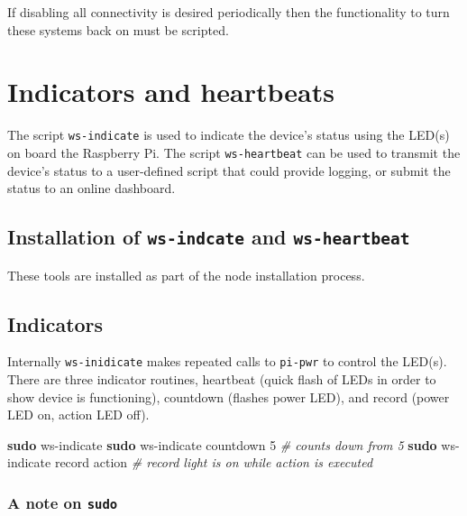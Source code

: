 \documentclass[
]{book}
\newenvironment{Shaded}{\begin{snugshade}}{\end{snugshade}}
\newcommand{\CommentTok}[1]{\textcolor[rgb]{0.56,0.35,0.01}{\textit{#1}}}
\newcommand{\FunctionTok}[1]{\textcolor[rgb]{0.13,0.29,0.53}{\textbf{#1}}}
\newcommand{\NormalTok}[1]{#1}
\begin{document}
If disabling all connectivity is desired periodically then the functionality to turn these systems back on must be scripted.

\hypertarget{indicators-and-heartbeats}{%
\chapter{Indicators and heartbeats}\label{indicators-and-heartbeats}}

The script \texttt{ws-indicate} is used to indicate the device's status using the LED(s) on board the Raspberry Pi. The script \texttt{ws-heartbeat} can be used to transmit the device's status to a user-defined script that could provide logging, or submit the status to an online dashboard.

\hypertarget{installation-of-ws-indcate-and-ws-heartbeat}{%
\section{\texorpdfstring{Installation of \texttt{ws-indcate} and \texttt{ws-heartbeat}}{Installation of ws-indcate and ws-heartbeat}}\label{installation-of-ws-indcate-and-ws-heartbeat}}

These tools are installed as part of the node installation process.

\hypertarget{indicators}{%
\section{Indicators}\label{indicators}}

Internally \texttt{ws-inidicate} makes repeated calls to \texttt{pi-pwr} to control the LED(s). There are three indicator routines, heartbeat (quick flash of LEDs in order to show device is functioning), countdown (flashes power LED), and record (power LED on, action LED off).

\begin{Shaded}
\begin{Highlighting}[]
\FunctionTok{sudo}\NormalTok{ ws{-}indicate}
\FunctionTok{sudo}\NormalTok{ ws{-}indicate countdown 5   }\CommentTok{\# counts down from 5}
\FunctionTok{sudo}\NormalTok{ ws{-}indicate record action }\CommentTok{\# record light is on while action is executed}
\end{Highlighting}
\end{Shaded}

\hypertarget{a-note-on-sudo}{%
\subsection{\texorpdfstring{A note on \texttt{sudo}}{A note on sudo}}\label{a-note-on-sudo}}
\end{document}
